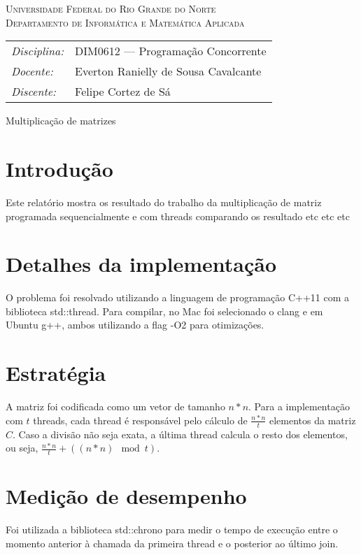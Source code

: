 \documentclass[12pt, a4paper]{article}
\begin{document}
\begin{center}
    \textsc{Universidade Federal do Rio Grande do Norte} \\
    \textsc{Departamento de Informática e Matemática Aplicada}
\end{center}

\bigskip

\begin{tabular}{@{}ll@{}}
    \emph{Disciplina:} & DIM0612 --- Programação Concorrente \\
    \emph{Docente:}    & Everton Ranielly de Sousa Cavalcante \\
    \emph{Discente:}   & Felipe Cortez de Sá \\
\end{tabular}

\bigskip

\begin{center}
\large Multiplicação de matrizes
\end{center}

\bigskip

\section{Introdução}
Este relatório mostra os resultado do trabalho da multiplicação de matriz
programada sequencialmente e com threads comparando os resultado etc etc etc

\section{Detalhes da implementação}
O problema foi resolvado utilizando a linguagem de programação C++11 com a
biblioteca std::thread. Para compilar, no Mac foi selecionado o clang e em
Ubuntu g++, ambos utilizando a flag -O2 para otimizações.

\section{Estratégia}
A matriz foi codificada como um vetor de tamanho $ n * n $. Para a implementação com $ t $ threads,
cada thread é responsável pelo cálculo de $ \frac{n * n}{t} $ elementos da matriz $ C $. Caso a divisão não seja exata,
a última thread calcula o resto dos elementos, ou seja, $ \frac{n * n}{t} + ((n * n) \mod t) $.

\section{Medição de desempenho}
Foi utilizada a biblioteca std::chrono para medir o tempo de execução entre o
momento anterior à chamada da primeira thread e o posterior ao último join.
\end{document}
